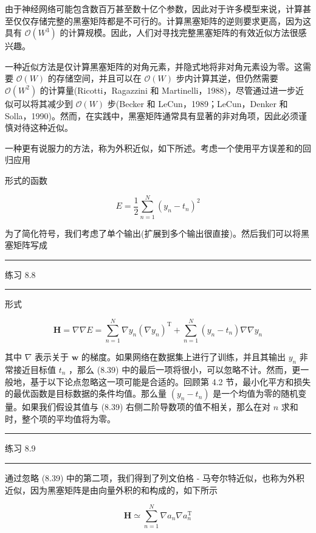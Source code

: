 \documentclass[10pt]{article}
\newcommand{\HRule}{\begin{center}\rule{0.9\linewidth}{0.2mm}\end{center}}
\begin{document}
由于神经网络可能包含数百万甚至数十亿个参数，因此对于许多模型来说，计算甚至仅仅存储完整的黑塞矩阵都是不可行的。计算黑塞矩阵的逆则要求更高，因为这具有 \(\mathcal{O}\left( {W}^{3}\right)\) 的计算规模。因此，人们对寻找完整黑塞矩阵的有效近似方法很感兴趣。

一种近似方法是仅计算黑塞矩阵的对角元素，并隐式地将非对角元素设为零。这需要 \(\mathcal{O}\left( W\right)\) 的存储空间，并且可以在 \(\mathcal{O}\left( W\right)\) 步内计算其逆，但仍然需要 \(\mathcal{O}\left( {W}^{2}\right)\) 的计算量(Ricotti，Ragazzini 和 Martinelli，1988)，尽管通过进一步近似可以将其减少到 \(\mathcal{O}\left( W\right)\) 步(Becker 和 LeCun，1989；LeCun，Denker 和 Solla，1990)。然而，在实践中，黑塞矩阵通常具有显著的非对角项，因此必须谨慎对待这种近似。

一种更有说服力的方法，称为外积近似，如下所述。考虑一个使用平方误差和的回归应用

形式的函数

\[
E = \frac{1}{2}\mathop{\sum }\limits_{{n = 1}}^{N}{\left( {y}_{n} - {t}_{n}\right) }^{2} \tag{8.38}
\]

为了简化符号，我们考虑了单个输出(扩展到多个输出很直接)。然后我们可以将黑塞矩阵写成

\HRule

练习 8.8

\HRule

形式

\[
\mathbf{H} = \nabla \nabla E = \mathop{\sum }\limits_{{n = 1}}^{N}\nabla {y}_{n}{\left( \nabla {y}_{n}\right) }^{\mathrm{T}} + \mathop{\sum }\limits_{{n = 1}}^{N}\left( {{y}_{n} - {t}_{n}}\right) \nabla \nabla {y}_{n} \tag{8.39}
\]

其中 \(\nabla\) 表示关于 \(\mathbf{w}\) 的梯度。如果网络在数据集上进行了训练，并且其输出 \({y}_{n}\) 非常接近目标值 \({t}_{n}\) ，那么 (8.39) 中的最后一项将很小，可以忽略不计。然而，更一般地，基于以下论点忽略这一项可能是合适的。回顾第 4.2 节，最小化平方和损失的最优函数是目标数据的条件均值。那么量 \(\left( {{y}_{n} - {t}_{n}}\right)\) 是一个均值为零的随机变量。如果我们假设其值与 (8.39) 右侧二阶导数项的值不相关，那么在对 \(n\) 求和时，整个项的平均值将为零。

\HRule

练习 8.9

\HRule

通过忽略 (8.39) 中的第二项，我们得到了列文伯格 - 马夸尔特近似，也称为外积近似，因为黑塞矩阵是由向量外积的和构成的，如下所示

\[
\mathbf{H} \simeq  \mathop{\sum }\limits_{{n = 1}}^{N}\nabla {a}_{n}\nabla {a}_{n}^{\mathrm{T}} \tag{8.40}
\]
\end{document}
